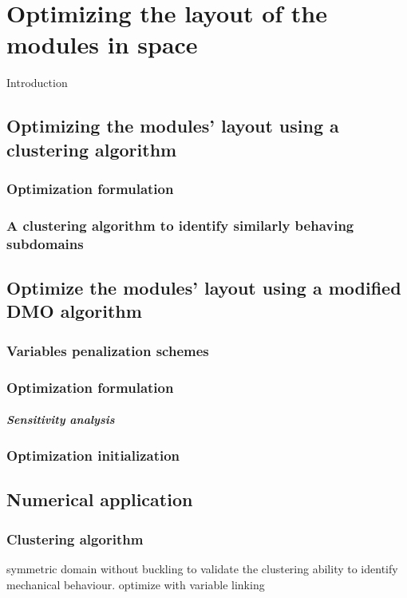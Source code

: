 \setchapterpreamble[u]{\margintoc}
\chapter{Optimizing the layout of the modules in space}
Introduction
\section{Optimizing the modules' layout using a clustering algorithm}

\subsection{Optimization formulation}

\subsection{A clustering algorithm to identify similarly behaving subdomains}

\section{Optimize the modules' layout using a modified DMO algorithm}

\subsection{Variables penalization schemes}

\subsection{Optimization formulation}

\paragraph{Sensitivity analysis}

\subsection{Optimization initialization}

\section{Numerical application}

\subsection{Clustering algorithm}
symmetric domain without buckling to validate the clustering ability to identify mechanical behaviour. optimize with variable linking

